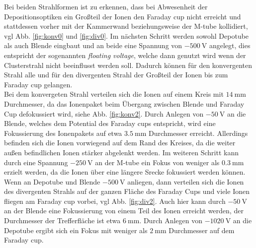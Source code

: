 Bei beiden Strahlformen ist zu erkennen, dass bei Abwesenheit der Depositionsoptiken ein Großteil der Ionen den Faraday cup nicht erreicht und stattdessen vorher mit der Kammerwand beziehungsweise der M-tube kollidiert, vgl Abb. \ref{fig:konv0} und \ref{fig:div0}.
Im nächsten Schritt werden sowohl Depotube als auch Blende eingbaut und an beide eine Spannung von $\SI{-500}{\volt}$ angelegt, dies entspricht der sogenannten \textit{floating voltage}, welche dann genutzt wird wenn der Clusterstrahl nicht beeinflusst werden soll.
Dadurch können für den konvergenten Strahl alle und für den divergenten Strahl der Großteil der Ionen bis zum Faraday cup gelangen.\\

Bei dem konvergeten Strahl verteilen sich die Ionen auf einem Kreis mit $\SI{14}{\mm}$ Durchmesser, da das Ionenpaket beim Übergang zwischen Blende und Faraday Cup defokussiert wird, siehe Abb. \ref{fig:konv2}.
Durch Anlegen von $\SI{-50}{\volt}$ an die Blende, welches dem Potential des Faraday cups entspricht, wird eine Fokussierung des Ionenpakets auf etwa $\SI{3,5}{\mm}$ Durchmesser erreicht.
Allerdings befinden sich die Ionen vorwiegend auf dem Rand des Kreises, da die weiter außen befindlichen Ionen stärker abgelenkt werden.
Im weiteren Schritt kann durch eine Spannung $\SI{-250}{\volt}$ an der M-tube ein Fokus von weniger als $\SI{0,3}{\mm}$ erzielt werden, da die Ionen über eine längere Srecke fokussiert werden können.\\

Wenn an Depotube und Blende $\SI{-500}{\volt}$ anliegen, dann verteilen sich die Ionen des divergenten Strahls auf der ganzen Fläche des Faraday Cups und viele Ionen fliegen am Faraday cup vorbei, vgl Abb. \ref{fig:div2}.
Auch hier kann durch $\SI{-50}{\volt}$ an der Blende eine Fokussierung von einem Teil des Ionen erreicht werden, der Durchmesser der Trefferfläche ist etwa $\SI{6}{\mm}$.
Durch Anlegen von $\SI{-1020}{\volt}$ an die Depotube ergibt sich ein Fokus mit weniger als $\SI{2}{\mm}$ Durchmesser auf dem Faraday cup.


